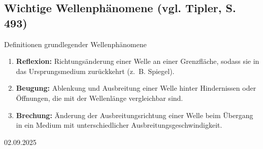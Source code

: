 \documentclass[11pt,a4paper,oneside]{article}
\newcommand{\lessondate}[1]{\noindent\hfill\textcolor{MarginalGray}{\textsc{#1}} \\ \vspace{0.5cm}}
\begin{document}
	
	\subsection*{Wichtige Wellenphänomene (vgl. Tipler, S. 493)}
	
	\begin{theo}{Definitionen grundlegender Wellenphänomene}
		\begin{enumerate}
			\item \textbf{Reflexion:} Richtungsänderung einer Welle an einer Grenzfläche, sodass sie in das Ursprungsmedium zurückkehrt (z.~B. Spiegel).
			\item \textbf{Beugung:} Ablenkung und Ausbreitung einer Welle hinter Hindernissen oder Öffnungen, die mit der Wellenlänge vergleichbar sind.
			\item \textbf{Brechung:} Änderung der Ausbreitungsrichtung einer Welle beim Übergang in ein Medium mit unterschiedlicher Ausbreitungsgeschwindigkeit.
		\end{enumerate}
	\end{theo}
	
	
	
	
	
	
	
	\newpage
	\lessondate{02.09.2025}\\
	
\end{document}
